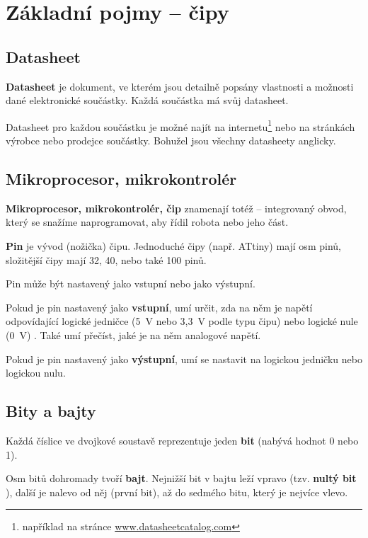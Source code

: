 \section{Základní pojmy -- čipy}

\subsection{Datasheet}

{\bf Datasheet}  je dokument, ve kterém jsou detailně popsány vlastnosti a možnosti dané elektronické součástky. Každá součástka má svůj datasheet. 

Datasheet pro každou součástku je možné najít na internetu\footnote{například na stránce \url{www.datasheetcatalog.com}}
 nebo na stránkách výrobce nebo prodejce součástky. Bohužel jsou všechny datasheety anglicky.  

\subsection{Mikroprocesor, mikrokontrolér} 

{\bf Mikroprocesor, mikrokontrolér, čip}   
 znamenají totéž -- integrovaný obvod, který se snažíme naprogramovat, aby řídil robota nebo jeho část. \hypertarget{cip1}{}

{\bf Pin}  je vývod (nožička) čipu. Jednoduché čipy (např. ATtiny) mají osm pinů, složitější čipy mají 32, 40, nebo také 100 pinů.

Pin může být nastavený jako vstupní nebo jako výstupní. 

Pokud je pin nastavený jako {\bf vstupní}, umí určit, zda na něm je napětí odpovídající logické jedničce (5~V nebo 3,3~V podle typu čipu) nebo logické nule (0~V) . Také umí přečíst, jaké je na něm analogové napětí. %

Pokud je pin nastavený jako {\bf výstupní},  umí se nastavit na logickou jedničku nebo logickou nulu. %

\subsection{Bity a bajty}

Každá číslice ve dvojkové soustavě reprezentuje jeden {\bf bit}  (nabývá hodnot 0 nebo 1). 

Osm bitů dohromady tvoří  {\bf bajt}. Nejnižší bit v bajtu leží vpravo (tzv. {\bf nultý bit}   ),  další je nalevo od něj (první bit), až do sedmého bitu, který je nejvíce vlevo.




